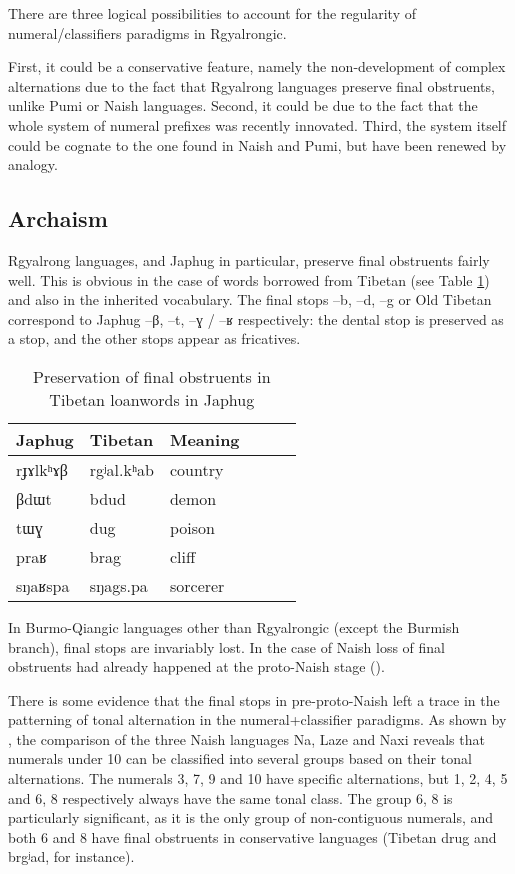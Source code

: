 \documentclass[oldfontcommands,oneside,a4paper,12pt]{article}
\newcommand{\ipa}[1]{{\phon#1}}
\begin{document}
There are three logical possibilities to account for the regularity of numeral/classifiers paradigms in Rgyalrongic. 

First, it could be a conservative feature, namely the non-development of complex alternations due to the fact that Rgyalrong languages preserve final obstruents, unlike Pumi or Naish languages. Second, it could be due to the fact that the whole system of numeral prefixes was recently innovated. Third, the system itself could be cognate to the one found in Naish and Pumi, but have been renewed by analogy. 

\subsection{Archaism}

Rgyalrong languages, and Japhug in particular, preserve final obstruents fairly well. This is obvious in the case of words borrowed from Tibetan (see Table \ref{tab:tib.borrow}) and also in the inherited vocabulary. The final stops \ipa{--b}, \ipa{--d}, \ipa{--g} or Old Tibetan correspond to Japhug \ipa{--β}, \ipa{--t}, \ipa{--ɣ} / \ipa{--ʁ} respectively: the dental stop is preserved as a stop, and the other stops appear as fricatives. 

\begin{table}[H]
\caption{Preservation of final obstruents in Tibetan loanwords in Japhug} \label{tab:tib.borrow} \centering
\begin{tabular}{llllll}
\toprule
Japhug &Tibetan & Meaning\\
\midrule
 \ipa{rɟɤlkʰɤβ}  & 	\ipa{rgʲal.kʰab}  & country 	\\
 \ipa{βdɯt}  & 	\ipa{bdud}  & demon 	\\
 \ipa{tɯɣ}  & 	\ipa{dug}  & poison 	\\
 \ipa{praʁ}  & 	\ipa{brag}  & cliff 	\\
 \ipa{sŋaʁspa}  & 	\ipa{sŋags.pa}  & sorcerer 	\\
\bottomrule
\end{tabular}
\end{table}

In Burmo-Qiangic languages other than Rgyalrongic (except the Burmish branch), final stops are invariably lost. In the case of Naish loss of final obstruents had already happened at the proto-Naish stage (\citealt{jacques.michaud11naish}).

There is some evidence that the final stops in pre-proto-Naish left a trace in the patterning of tonal alternation in the numeral+classifier paradigms. As shown by \citet[16-17]{michaud11cl}, the comparison of the three Naish languages Na, Laze and Naxi reveals that numerals under 10 can be classified into several groups based on their tonal alternations. The numerals 3, 7, 9 and 10 have specific alternations, but {1, 2}, {4, 5} and {6, 8} respectively always have the same tonal class. The group {6, 8} is particularly significant, as it is the only group of non-contiguous numerals, and both 6 and 8 have final obstruents in conservative languages (Tibetan \ipa{drug} and \ipa{brgʲad}, for instance).
\end{document}
